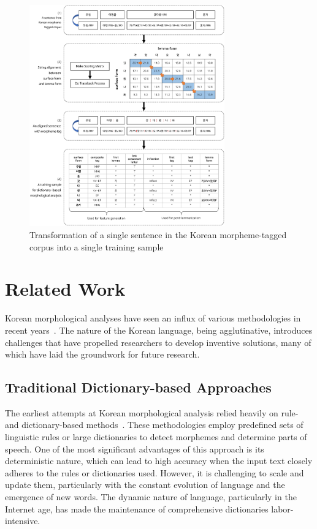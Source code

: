 \documentclass[AMS,STIX2COL]{WileyNJD-v2}
\begin{document}
    \begin{figure}[t]
        \centerline{\includegraphics[width=0.75\textwidth]{fig1.1}}
        \caption{Transformation of a single sentence in the Korean morpheme-tagged corpus into a single training sample}\label{fig:sample}
    \end{figure}


    \section{Related Work}\label{sec:related-work}

    Korean morphological analyses have seen an influx of various methodologies in recent years~\cite{KwonHC1991, LeeDG2009, ShimKS2011, LeeJS2011, ShinJC2012, LeeCK2013, NaSH2014, NaSH2015, HwangHS2016, KimHM2016, ChungES2016, LeeCH2016, Li2017, NaSH2018, KimSW2018, ChoiYS2018, MinJW2018, MinJW2019, KimHM2019, SongHJ2019, MinJW2020, SongHJ2020, ChoiYS2020, HwangHS2020, KimHJ2021, YounJY2021, MinJW2022, KimJM2022, ShinHJ2023}. The nature of the Korean language, being agglutinative, introduces challenges that have propelled researchers to develop inventive solutions, many of which have laid the groundwork for future research.

    \subsection{Traditional Dictionary-based Approaches}\label{subsec2.1}
    The earliest attempts at Korean morphological analysis relied heavily on rule- and dictionary-based methods~\cite{KwonHC1991}. These methodologies employ predefined sets of linguistic rules or large dictionaries to detect morphemes and determine parts of speech. One of the most significant advantages of this approach is its deterministic nature, which can lead to high accuracy when the input text closely adheres to the rules or dictionaries used. However, it is challenging to scale and update them, particularly with the constant evolution of language and the emergence of new words. The dynamic nature of language, particularly in the Internet age, has made the maintenance of comprehensive dictionaries labor-intensive.
\end{document}
